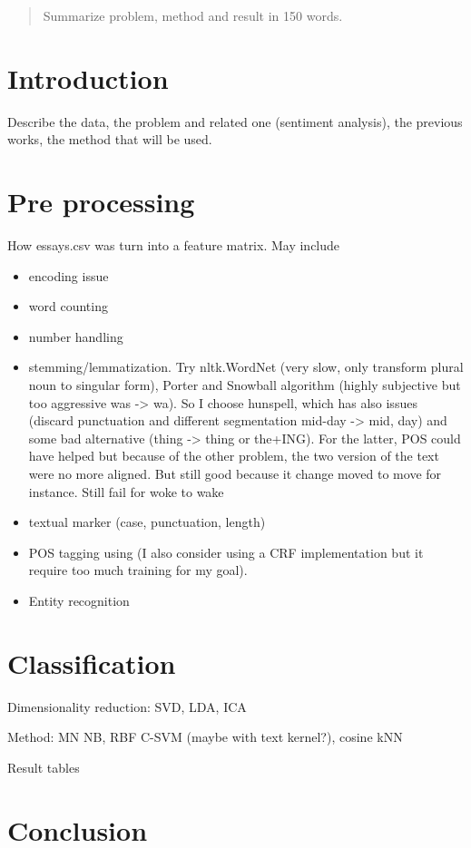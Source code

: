 \begin{abstract}
	Summarize problem, method and result in 150 words.
\end{abstract}

\section{Introduction}
Describe the data, the problem and related one (sentiment analysis), the
previous works\cite{mairesse2007perso}, the method that will be used.

\section{Pre processing}
How essays.csv was turn into a feature matrix. May include
\begin{itemize}
\item encoding issue
\item word counting
\item number handling
\item stemming/lemmatization. Try nltk.WordNet (very slow, only transform plural noun to singular form), Porter and Snowball algorithm (highly subjective but too aggressive was -> wa). So I choose hunspell, which has also issues (discard punctuation and different segmentation mid-day -> mid, day) and some bad alternative (thing -> thing or the+ING). For the latter, POS could have helped but because of the other problem, the two version of the text were no more aligned. But still good because it change moved to move for instance. Still fail for woke to wake
\item textual marker (case, punctuation, length)
\item POS tagging using \autocite{bird2009nltk} (I also consider
	using a CRF implementation \autocite[for instance][]{CRFsuite} but it
	require too much training for my goal).
\item Entity recognition
\end{itemize}

\section{Classification}
Dimensionality reduction: SVD, LDA, ICA

Method: MN NB, RBF C-SVM (maybe with text kernel?), cosine kNN

Result tables

\section{Conclusion}
